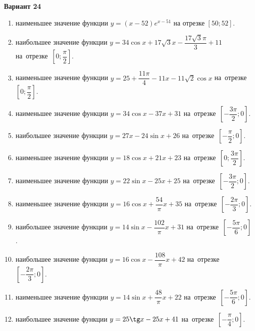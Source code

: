 \documentclass[a4paper,10pt]{article}
\begin{document}
\begin{center}\Large\textbf{Вариант 24}\end{center}

\begin{enumerate}
\item {} наименьшее значение функции $y = \left(x-52\right)e^{x-51}$ на отрезке $\left[50;52\right]$.

\item {} наибольшее значение функции $y = 34\cos x+17\sqrt{3}x-\dfrac{17\sqrt{3}\pi}{3} +11$ на~отрезке~$\left[0;\dfrac{\pi }{2}\right]$.

\item {} наименьшее значение функции $y = 25+\dfrac{11 \pi}{4}-11x-11\sqrt{2}\cos x$ на~отрезке~$\left[0;\dfrac{\pi }{2}\right]$.

\item {} наименьшее значение функции $y = 34\cos x-37x+31$ на~отрезке~$\left[-\dfrac{3\pi }{2};0\right]$.

\item {} наибольшее значение функции $y = 27x-24\sin x+26$ на~отрезке~$\left[-\dfrac{\pi }{2};0\right]$.

\item {} наименьшее значение функции $y = 18\cos x+21x+23$ на~отрезке~$\left[0;\dfrac{3\pi }{2}\right]$.

\item {} наименьшее значение функции $y = 22\sin x-25x+25$ на~отрезке~$\left[-\dfrac{3\pi }{2};0\right]$.

\item {} наименьшее значение функции $y = 16\cos x+\dfrac{54}{\pi }x +35$ на~отрезке~$\left[-\dfrac{2\pi }{3};0\right]$.

\item {} наибольшее значение функции $y = 14\sin x-\dfrac{102}{\pi }x+31$ на~отрезке~$\left[-\dfrac{5\pi }{6};0\right]$.

\item {} наибольшее значение функции $y = 16\cos x-\dfrac{108}{\pi }x+42$ на~отрезке~$\left[-\dfrac{2\pi }{3};0\right]$.

\item {} наименьшее значение функции $y = 14\sin x+\dfrac{48}{\pi }x+22$ на~отрезке~$\left[-\dfrac{5\pi }{6};0\right]$.

\item {} наибольшее значение функции $y = 25\tg x-25x+41$ на~отрезке~$\left[-\dfrac{\pi }{4};0\right]$.


\end{enumerate}
\end{document}
